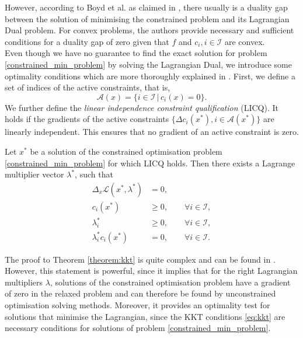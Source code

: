 However, according to Boyd et al. as claimed in \cite{Boyd:2004:CO:993483}, there usually is a duality gap between the solution of minimising the constrained problem and its Lagrangian Dual problem. For convex problems, the authors provide necessary and sufficient conditions for a duality gap of zero given that $f$ and $c_i, i \in \mathcal{I}$ are convex.\\
\indent Even though we have no guarantee to find the exact solution for problem \eqref{constrained_min_problem} by solving the Lagrangian Dual, we introduce some optimality conditions which are more thoroughly explained in \cite{NoceWrig06}. First, we define a set of indices of the active constraints, that is,
\[ \mathcal{A}(x) = \{ i \in \mathcal{I} \,|\, c_i(x) = 0 \}. \]
We further define the \textit{linear independence constraint qualification} (LICQ). It holds if the gradients of the active constraints $\{ \Delta c_i(x^*), i \in \mathcal{A}(x^*) \}$ are linearly independent. This ensures that no gradient of an active constraint is zero.
\begin{theorem}$\,$\\
	\label{theorem:kkt}
Let $x^*$ be a solution of the constrained optimisation problem \eqref{constrained_min_problem} for which LICQ holds. Then there exists a Lagrange multiplier vector $\lambda^*$, such that
\begin{subequations}
	\label{eq:kkt}
	\begin{align}
	\Delta_x \mathcal{L}(x^*, \lambda^*) &= 0,\\
	c_i(x^*) &\geq 0, \qquad \forall i \in \mathcal{I},\\
	\lambda^*_i &\geq 0, \qquad \forall i \in \mathcal{I},\\
	\lambda^*_i  c_i(x^*) &= 0, \qquad \forall i \in \mathcal{I}.
	\end{align}
\end{subequations}
\end{theorem}

The proof to Theorem \ref{theorem:kkt} is quite complex and can be found in \cite{NoceWrig06}. However, this statement is powerful, since it implies that for the right Lagrangian multipliers $\lambda$, solutions of the constrained optimisation problem have a gradient of zero in the relaxed problem and can therefore be found by unconstrained optimisation solving methods. Moreover, it provides an optimality test for solutions that minimise the Lagrangian, since the KKT conditions \eqref{eq:kkt} are necessary conditions for solutions of problem \eqref{constrained_min_problem}.\\



